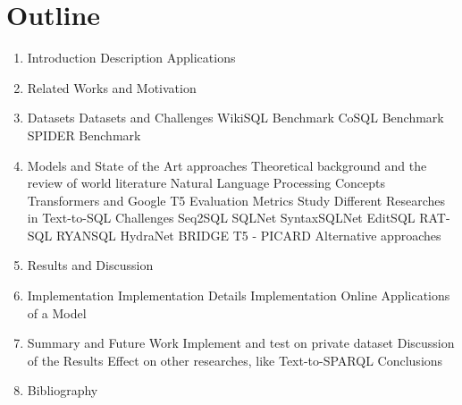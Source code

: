 \section{Outline}
\begin{enumerate}

      \item Introduction
            \subitem Description
            \subitem Applications
      \item Related Works and Motivation
      \item Datasets
            \subitem Datasets and Challenges
            \subitem WikiSQL Benchmark
            \subitem CoSQL Benchmark
            \subitem SPIDER Benchmark
      \item Models and State of the Art approaches
            \subitem Theoretical background and the review of world literature
            \subitem Natural Language Processing Concepts
            \subitem Transformers and Google T5 \cite{2020t5}
            \subitem Evaluation Metrics \cite{vig_comparison_2019}
            \subitem Study Different Researches in Text-to-SQL Challenges
            \subsubitem Seq2SQL \cite{zhong_seq2sql_2017}
            \subsubitem SQLNet \cite{xu_sqlnet_2017}
            \subsubitem SyntaxSQLNet \cite{DBLP:journals/corr/abs-1810-05237}
            \subsubitem EditSQL \cite{zhang2019editing}
            \subsubitem RAT-SQL \cite{wang_rat-sql_2021}
            \subsubitem RYANSQL \cite{choi_ryansql_2020}
            \subsubitem HydraNet \cite{lyu_hybrid_2020}
            \subsubitem BRIDGE \cite{lin_bridging_2020}
            \subsubitem T5 - PICARD \cite{scholak_picard_2021}
            \subsubitem Alternative approaches
      \item Results and Discussion
      \item Implementation
            \subitem Implementation Details
            \subitem Implementation Online Applications of a Model
      \item Summary and Future Work
            \subitem Implement and test on private dataset
            \subitem Discussion of the Results
            \subitem Effect on other researches, like Text-to-SPARQL
            \subitem Conclusions
      \item Bibliography

\end{enumerate}
